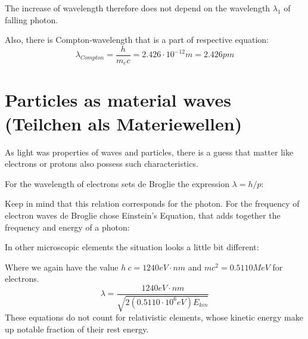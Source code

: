 \documentclass{report}
\begin{document}

The increase of wavelength therefore does not depend on the wavelength $\lambda_1$ of falling photon. 

Also, there is Compton-wavelength that is a part of respective equation:
\begin{equation}
    \lambda_{Compton} = \frac{h}{m_e c} = 2.426 \cdot 10^{-12} m = 2.426 pm
\end{equation}

\section{Particles as material waves (Teilchen als Materiewellen)}
As light was properties of waves and particles, there is a guess that matter  like electrons or protons also possess such characteristics.

For the wavelength of electrons sets de Broglie the expression $\lambda = h / p$:


Keep in mind that this relation corresponds for the photon. For the frequency of electron waves de Broglie chose Einstein's Equation, that adds together the frequency and energy of a photon:

In other microscopic elements the situation looks a little bit different:

Where we again have the value $h \ c = 1240 eV\cdot nm$ and $m c^2 = 0.5110 MeV$ for electrons.
\begin{equation*}
    \lambda = \frac{1240 eV\cdot nm}{\sqrt{2 (0.5110 \cdot 10^6 eV) E_{kin}}}
\end{equation*}
These equations do not count for relativistic elements, whose kinetic energy make up notable fraction of their rest energy.
\end{document}
